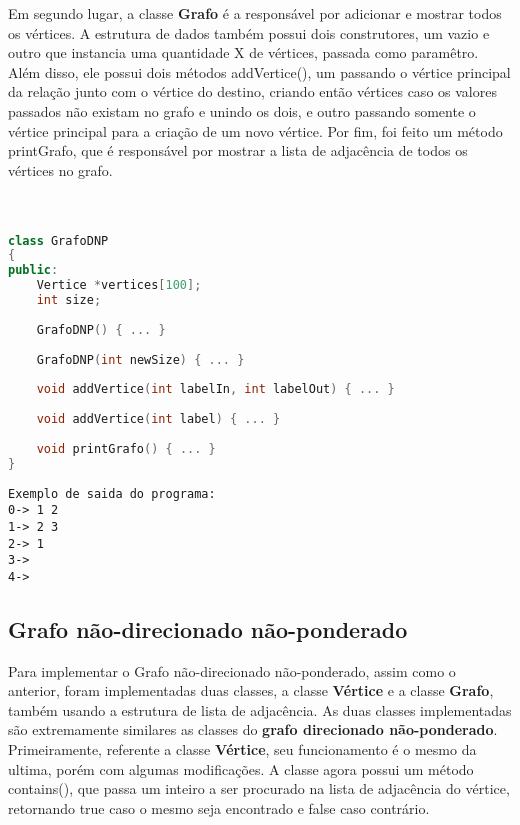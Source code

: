 \documentclass[12pt]{article}
\begin{document}
Em segundo lugar, a classe \textbf{Grafo} é a responsável por adicionar e mostrar todos os vértices. A estrutura de dados também possui dois construtores, um vazio e outro que instancia uma quantidade X de vértices, passada como paramêtro. Além disso, ele possui dois métodos addVertice(), um passando o vértice principal da relação junto com o vértice do destino, criando então vértices caso os valores passados não existam no grafo e unindo os dois, e outro passando somente o vértice principal para a criação de um novo vértice. Por fim, foi feito um método printGrafo, que é responsável por mostrar a lista de adjacência de todos os vértices no grafo. \\ \\ \\ 

\begin{lstlisting}[language = C++]
class GrafoDNP
{
public:
    Vertice *vertices[100];
    int size;
    
    GrafoDNP() { ... }
    
    GrafoDNP(int newSize) { ... }
    
    void addVertice(int labelIn, int labelOut) { ... }
    
    void addVertice(int label) { ... }
    
    void printGrafo() { ... }
}

\end{lstlisting}

\begin{lstlisting}[]
Exemplo de saida do programa:
0-> 1 2 
1-> 2 3 
2-> 1 
3-> 
4-> 
\end{lstlisting}


\subsection{Grafo não-direcionado não-ponderado}
Para implementar o Grafo não-direcionado não-ponderado, assim como o anterior, foram implementadas duas classes, a classe \textbf{Vértice} e a classe \textbf{Grafo}, também usando a estrutura de lista de adjacência. As duas classes implementadas são extremamente similares as classes do \textbf{grafo direcionado não-ponderado}. \\
Primeiramente, referente a classe \textbf{Vértice}, seu funcionamento é o mesmo da ultima, porém com algumas modificações. A classe agora possui um método contains(), que passa um inteiro a ser procurado na lista de adjacência do vértice, retornando true caso o mesmo seja encontrado e false caso contrário.
\end{document}
